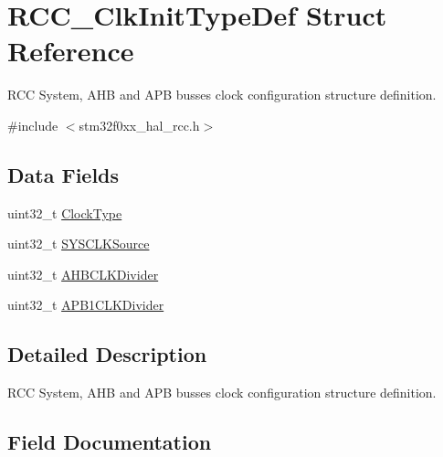 \hypertarget{struct_r_c_c___clk_init_type_def}{}\section{R\+C\+C\+\_\+\+Clk\+Init\+Type\+Def Struct Reference}
\label{struct_r_c_c___clk_init_type_def}


R\+CC System, A\+HB and A\+PB busses clock configuration structure definition.  




{\ttfamily \#include $<$stm32f0xx\+\_\+hal\+\_\+rcc.\+h$>$}

\subsection*{Data Fields}
\begin{DoxyCompactItemize}
\item 
uint32\+\_\+t \hyperlink{struct_r_c_c___clk_init_type_def_afe92b105bff8e698233c286bb3018384}{Clock\+Type}
\item 
uint32\+\_\+t \hyperlink{struct_r_c_c___clk_init_type_def_a02b70c23b593a55814d887f483ea0871}{S\+Y\+S\+C\+L\+K\+Source}
\item 
uint32\+\_\+t \hyperlink{struct_r_c_c___clk_init_type_def_a082c91ea9f270509aca7ae6ec42c2a54}{A\+H\+B\+C\+L\+K\+Divider}
\item 
uint32\+\_\+t \hyperlink{struct_r_c_c___clk_init_type_def_a994aca51c40decfc340e045da1a6ca19}{A\+P\+B1\+C\+L\+K\+Divider}
\end{DoxyCompactItemize}


\subsection{Detailed Description}
R\+CC System, A\+HB and A\+PB busses clock configuration structure definition. 

\subsection{Field Documentation}
\mbox{\label{struct_r_c_c___clk_init_type_def_a082c91ea9f270509aca7ae6ec42c2a54}} 
